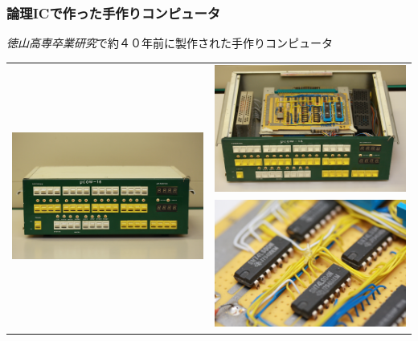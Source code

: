 \documentclass{beamer}                 %
\begin{document}
\begin{frame}
  \frametitle{論理ICで作った手作りコンピュータ}
  \emph{徳山高専卒業研究}で約４０年前に製作された手作りコンピュータ
  \vfill
  \begin{tabular}{c c}
  \multirow{2}{*}{\includegraphics[scale=0.04]{../Img/uCom16_1.jpg}}
  &\includegraphics[scale=0.03]{../Img/uCom16_2.jpg} \\
  &\includegraphics[scale=0.03]{../Img/uCom16_3.jpg}
  \end{tabular}
\end{frame}
\end{document}
